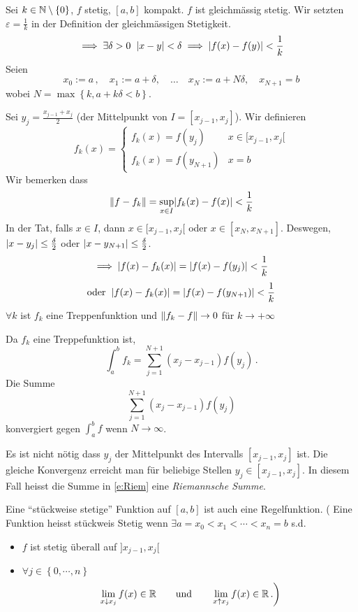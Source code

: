\begin{Bew}
  Sei $k\in\mathbb{N}\setminus\left\{ 0 \right\}$, $f$ stetig, $[a,b]$ kompakt. $f$ ist gleichmässig stetig.  
Wir setzten $\varepsilon=\frac{1}{k}$ in der Definition der gleichmässigen Stetigkeit.
  \[\implies\exists\delta>0\hspace{2mm}\mathopen| x-y \mathclose|<\delta\implies\mathopen| f(x)-f(y) \mathclose|<\frac{1}{k}\]
  Seien
\[ x_0 := a\,, \quad x_1 := a+\delta, \quad \ldots \quad 
x_N := a+N\delta, \quad x_{N+1} = b\]
wobei $N=\max\left\{ k,a+k\delta<b \right\}$. 

Sei $y_j=\frac{x_{j-1}+x_j}{2}$ (der Mittelpunkt von $I=[x_{j-1},x_j]$). Wir definieren
  \[ f_k(x)= \begin{cases}
    f_k(x)=f(y_j)& x\in [x_{j-1},x_j[\\
    f_k(x)=f(y_{N+1})&x=b
  \end{cases}\]
Wir bemerken dass
  \[\left\| f-f_k \right\|=\sup_{x\in I}\mathopen| f_k(x)-f(x) \mathclose|<\frac{1}{k}\]
In der Tat, falls $x\in I$, dann 
$x\in [x_{j-1},x_j[$ oder $x\in [x_N,x_{N+1}]$. Deswegen, 
$\mathopen| x-y_j \mathclose|\leq \frac{\delta}{2}$ oder $\mathopen| x-y_{N+1} \mathclose|\leq \frac{\delta}{2}$.
\[\implies \mathopen| f(x)-f_k(x) \mathclose|=\mathopen| f(x)-f(y_j) \mathclose|<\frac{1}{k}\]
  \[\text{oder}\hspace{2mm}\mathopen| f(x)-f_k(x) \mathclose|=\mathopen| f(x)-f(y_{N+1}) \mathclose|<\frac{1}{k}\]
  $\forall k$ ist $f_k$ eine Treppenfunktion und $\left\| f_k-f \right\|\to 0$ für $k\to+\infty$
\end{Bew}
\begin{Bem} Da $f_k$ eine Treppefunktion ist,
\[\int_a^bf_k=\sum_{j=1}^{N+1}(x_j-x_{j-1})f(y_j)\, .\]
Die Summe 
\begin{equation}\label{e:Riem}
\sum_{j=1}^{N+1}(x_j-x_{j-1})f(y_j) 
\end{equation}
konvergiert gegen $\int_a^b f$ wenn $N\to\infty$.

Es ist nicht n\"otig dass $y_j$ der Mittelpunkt des Intervalls $[x_{j-1}, x_j]$ 
ist. Die gleiche Konvergenz erreicht man f\"ur beliebige Stellen $y_j\in [x_{j-1}, x_j]$.
In diesem Fall heisst die Summe in \eqref{e:Riem} eine {\em Riemannsche Summe}. 
\end{Bem}
\begin{Kor}
  Eine ``stückweise stetige'' Funktion auf $[a,b]$ ist auch eine Regelfunktion. 
( Eine Funktion heisst st\"uckweis Stetig wenn $\exists a=x_0<x_1<\cdots<x_n=b$ s.d.
  \begin{itemize}
    \item $f$ ist stetig überall auf $]x_{j-1}, x_j[$
    \item $\forall j\in \left\{ 0,\cdots,n \right\}$
      \[\left.\lim_{x\downarrow x_j}f(x)\in\mathbb{R} \qquad \mbox{und} \qquad 
\lim_{x\uparrow x_j}f(x)\in\mathbb{R}\, .\right)\] 
  \end{itemize}
\end{Kor}

